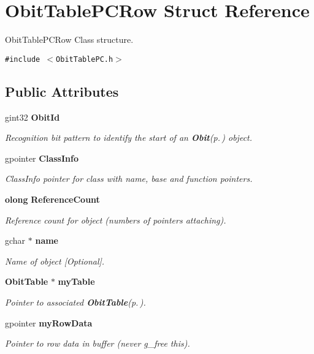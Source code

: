 \section{Obit\-Table\-PCRow Struct Reference}
\label{structObitTablePCRow}
Obit\-Table\-PCRow Class structure.  


{\tt \#include $<$Obit\-Table\-PC.h$>$}

\subsection*{Public Attributes}
\begin{CompactItemize}
\item 
gint32 {\bf Obit\-Id}
\begin{CompactList}\small\item\em Recognition bit pattern to identify the start of an {\bf Obit}{\rm (p.\,\pageref{structObit})} object. \item\end{CompactList}\item 
gpointer {\bf Class\-Info}
\begin{CompactList}\small\item\em Class\-Info pointer for class with name, base and function pointers. \item\end{CompactList}\item 
{\bf olong} {\bf Reference\-Count}
\begin{CompactList}\small\item\em Reference count for object (numbers of pointers attaching). \item\end{CompactList}\item 
gchar $\ast$ {\bf name}
\begin{CompactList}\small\item\em Name of object [Optional]. \item\end{CompactList}\item 
{\bf Obit\-Table} $\ast$ {\bf my\-Table}
\begin{CompactList}\small\item\em Pointer to associated {\bf Obit\-Table}{\rm (p.\,\pageref{structObitTable})}. \item\end{CompactList}\item 
gpointer {\bf my\-Row\-Data}
\begin{CompactList}\small\item\em Pointer to row data in buffer (never g\_\-free this). \item\end{CompactList}\item 

\end{CompactItemize}
